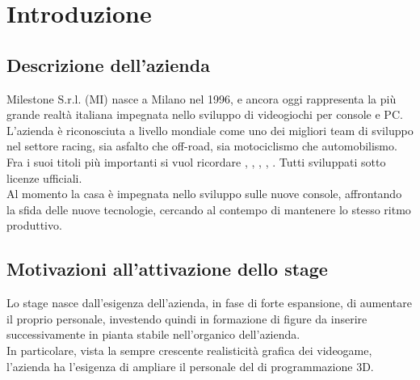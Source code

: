 
\chapter{Introduzione}
\label{cap:introduzione}

\section{Descrizione dell'azienda}

Milestone S.r.l. (MI) nasce a Milano nel 1996, e ancora oggi rappresenta la più grande realtà italiana impegnata nello sviluppo di videogiochi per console e PC. L'azienda è riconosciuta a livello mondiale come uno dei migliori team di sviluppo nel settore racing, sia asfalto che off-road, sia motociclismo che automobilismo.\\

Fra i suoi titoli più importanti si vuol ricordare , , , , . Tutti sviluppati sotto licenze ufficiali.\\

Al momento la casa è impegnata nello sviluppo sulle nuove console, affrontando la sfida delle nuove tecnologie, cercando al contempo di mantenere lo stesso ritmo produttivo. 

\section{Motivazioni all'attivazione dello stage}

Lo stage nasce dall'esigenza dell'azienda, in fase di forte espansione, di aumentare il proprio personale, investendo quindi in formazione di figure  da inserire successivamente in pianta stabile nell'organico dell'azienda.\\

In particolare, vista la sempre crescente realisticità grafica dei videogame, l'azienda ha l'esigenza di ampliare il personale del  di programmazione 3D.

